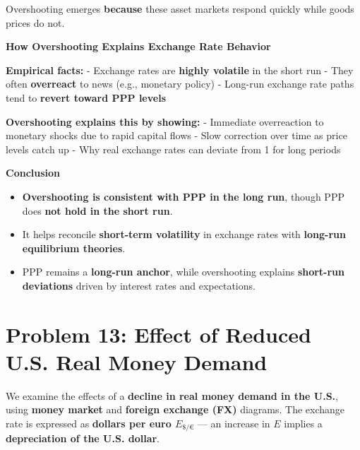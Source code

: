 \documentclass[
]{article}
\providecommand{\tightlist}{%
  \setlength{\itemsep}{0pt}\setlength{\parskip}{0pt}}
\begin{document}
Overshooting emerges \textbf{because} these asset markets respond
quickly while goods prices do not.

\textbf{How Overshooting Explains Exchange Rate Behavior}

\textbf{Empirical facts:} - Exchange rates are \textbf{highly volatile}
in the short run - They often \textbf{overreact} to news (e.g., monetary
policy) - Long-run exchange rate paths tend to \textbf{revert toward PPP
levels}

\textbf{Overshooting explains this by showing:} - Immediate overreaction
to monetary shocks due to rapid capital flows - Slow correction over
time as price levels catch up - Why real exchange rates can deviate from
1 for long periods

\textbf{Conclusion}

\begin{itemize}
\tightlist
\item
  \textbf{Overshooting is consistent with PPP in the long run}, though
  PPP does \textbf{not hold in the short run}.
\item
  It helps reconcile \textbf{short-term volatility} in exchange rates
  with \textbf{long-run equilibrium theories}.
\item
  PPP remains a \textbf{long-run anchor}, while overshooting explains
  \textbf{short-run deviations} driven by interest rates and
  expectations.
\end{itemize}

\section{Problem 13: Effect of Reduced U.S. Real Money
Demand}\label{problem-13-effect-of-reduced-u.s.-real-money-demand}

We examine the effects of a \textbf{decline in real money demand in the
U.S.}, using \textbf{money market} and \textbf{foreign exchange (FX)}
diagrams. The exchange rate is expressed as \textbf{dollars per euro
\(E_{\$/€}\)} --- an increase in \(E\) implies a \textbf{depreciation of
the U.S. dollar}.
\end{document}
